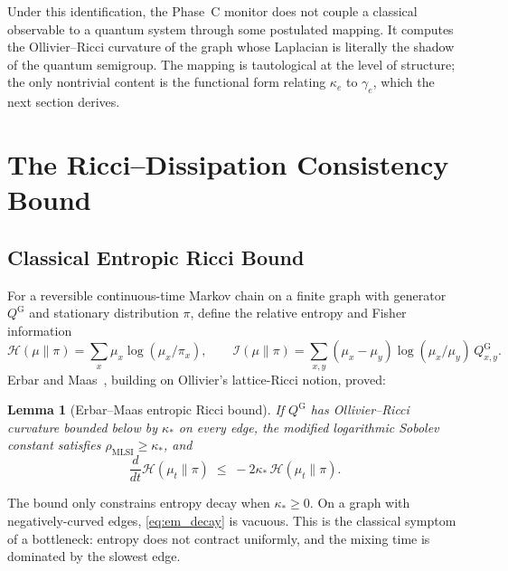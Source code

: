 \documentclass[11pt,letterpaper]{article}
\newtheorem{lemma}{Lemma}
\theoremstyle{definition}
\theoremstyle{remark}
\begin{document}
Under this identification, the Phase~C monitor does not couple a classical
observable to a quantum system through some postulated mapping. It computes
the Ollivier--Ricci curvature of the graph whose Laplacian is literally the
shadow of the quantum semigroup. The mapping is tautological at the level of
structure; the only nontrivial content is the functional form relating
$\kappa_e$ to $\gamma_e$, which the next section derives.

\section{The Ricci--Dissipation Consistency Bound}
\label{sec:theorem}

\subsection{Classical Entropic Ricci Bound}

For a reversible continuous-time Markov chain on a finite graph with
generator $Q^{\mathrm{G}}$ and stationary distribution $\pi$, define the
relative entropy and Fisher information
\begin{equation}
\mathcal{H}(\mu\|\pi) = \sum_x \mu_x \log(\mu_x/\pi_x),\qquad
\mathcal{I}(\mu\|\pi) = \sum_{x,y}(\mu_x - \mu_y)\log(\mu_x/\mu_y)\,Q^{\mathrm{G}}_{x,y}.
\end{equation}
Erbar and Maas~\cite{ErbarMaas2012}, building on Ollivier's
lattice-Ricci notion, proved:
\begin{lemma}[Erbar--Maas entropic Ricci bound]
\label{lem:erbar_maas}
If $Q^{\mathrm{G}}$ has Ollivier--Ricci curvature bounded below by $\kappa_*$
on every edge, the modified logarithmic Sobolev constant satisfies
$\rho_{\mathrm{MLSI}} \ge \kappa_*$, and
\begin{equation}
\frac{d}{dt}\mathcal{H}(\mu_t\|\pi) \;\le\; -2\kappa_* \,\mathcal{H}(\mu_t\|\pi).
\label{eq:em_decay}
\end{equation}
\end{lemma}

The bound only constrains entropy decay when $\kappa_*\ge 0$. On a graph with
negatively-curved edges, \eqref{eq:em_decay} is vacuous. This is the
classical symptom of a bottleneck: entropy does not contract uniformly, and
the mixing time is dominated by the slowest edge.
\end{document}
